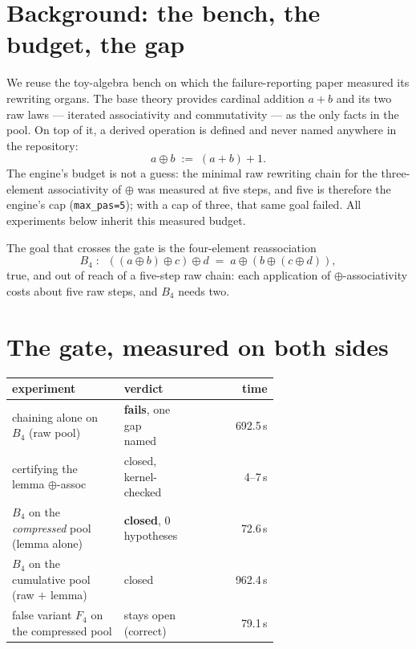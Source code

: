 \documentclass[11pt]{article}
\theoremstyle{remark}\newtheorem{remark}{Remark}
\begin{document}
\section{Background: the bench, the budget, the gap}
\label{sec:background}

We reuse the toy-algebra bench on which the failure-reporting paper measured
its rewriting organs. The base theory provides cardinal addition $a+b$ and its
two raw laws --- iterated associativity and commutativity --- as the only
facts in the pool. On top of it, a derived operation is defined and never
named anywhere in the repository:
\[
a \oplus b \;:=\; (a+b)+1 .
\]
The engine's budget is not a guess: the minimal raw rewriting chain for the
three-element associativity of $\oplus$ was measured at five steps, and five
is therefore the engine's cap (\texttt{max\_pas=5}); with a cap of three, that
same goal failed. All experiments below inherit this measured budget.

The goal that crosses the gate is the four-element reassociation
\[
B_4 \;:\;\; ((a \oplus b) \oplus c) \oplus d \;=\; a \oplus (b \oplus (c
\oplus d)),
\]
true, and out of reach of a five-step raw chain: each application of
$\oplus$-associativity costs about five raw steps, and $B_4$ needs two.

\section{The gate, measured on both sides}
\label{sec:porte}

\begin{center}\small
\begin{tabular}{@{}L{0.42\linewidth}L{0.24\linewidth}r@{}}
\toprule
experiment & verdict & time \\
\midrule
chaining alone on $B_4$ (raw pool) & \textbf{fails}, one gap named & 692.5\,s \\
certifying the lemma $\oplus$-assoc & closed, kernel-checked & 4--7\,s \\
$B_4$ on the \emph{compressed} pool (lemma alone) & \textbf{closed}, 0 hypotheses & 72.6\,s \\
$B_4$ on the cumulative pool (raw $+$ lemma) & closed & 962.4\,s \\
false variant $F_4$ on the compressed pool & stays open (correct) & 79.1\,s \\
\bottomrule
\end{tabular}
\end{center}
\end{document}
